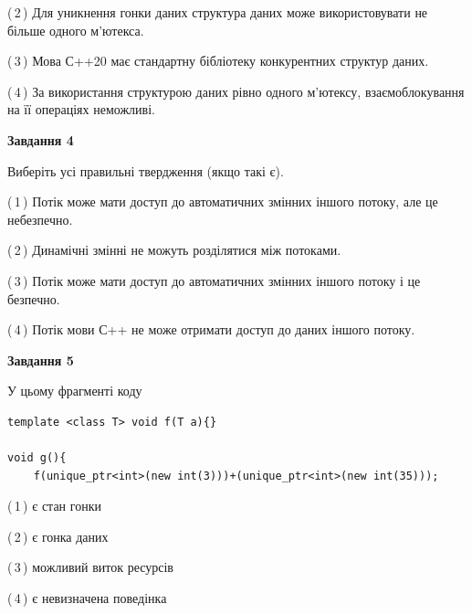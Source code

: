 \documentclass[12pt, ukrainian]{article}
\begin{document}
\begin {large}
{(\,2\,) Для уникнення гонки даних структура даних може використовувати не більше одного м’ютекса.%

(\,3\,) Мова С++20 має стандартну бібліотеку конкурентних структур даних.%

(\,4\,) За використання структурою даних рівно одного м’ютексу, взаємоблокування на її операціях неможливі.%



\begin{center}
\textbf{Завдання 4}
\end{center}
Виберіть усі правильні твердження (якщо такі є).\par
\vspace{2mm}

(\,1\,) Потік може мати доступ до автоматичних змінних іншого потоку, але це небезпечно.%

(\,2\,) Динамічні змінні не можуть розділятися між потоками.%

(\,3\,) Потік може мати доступ до автоматичних змінних іншого потоку і це безпечно.%

(\,4\,) Потік мови С++ не може отримати доступ до даних іншого потоку.%



\begin{center}
\textbf{Завдання 5}
\end{center}
У цьому фрагменті коду
\begin{verbatim}
template <class T> void f(T a){}

void g(){
    f(unique_ptr<int>(new int(3)))+(unique_ptr<int>(new int(35)));
\end{verbatim}

(\,1\,) є стан гонки%

(\,2\,) є гонка даних%

(\,3\,) можливий виток ресурсів%

(\,4\,) є невизначена поведінка%


}
\end {large}
\end{document}
